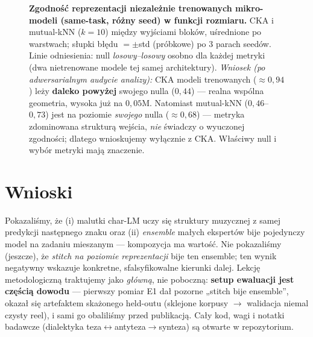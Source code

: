 \documentclass[11pt]{article}
\begin{document}
\begin{figure}[h]
\centering
{}
\caption{\textbf{Zgodność reprezentacji niezależnie trenowanych mikro-modeli (same-task, różny seed) w funkcji rozmiaru.} CKA \cite{cka} i mutual-kNN ($k{=}10$) między wyjściami bloków, uśrednione po warstwach; słupki błędu $=\pm$std (próbkowe) po 3 parach seedów. Linie odniesienia: null \emph{losowy--losowy} osobno dla każdej metryki (dwa nietrenowane modele tej samej architektury). \emph{Wniosek (po adwersarialnym audycie analizy):} CKA modeli trenowanych ($\approx0{,}94$) leży \textbf{daleko powyżej} swojego nulla ($0{,}44$) --- realna wspólna geometria, wysoka już na $0{,}05$M. Natomiast mutual-kNN ($0{,}46$--$0{,}73$) jest na poziomie \emph{swojego} nulla ($\approx0{,}68$) --- metryka zdominowana strukturą wejścia, \emph{nie} świadczy o wyuczonej zgodności; dlatego wnioskujemy wyłącznie z CKA. Właściwy null i wybór metryki mają znaczenie.}
\label{fig:cka}
\end{figure}

\section{Wnioski}
Pokazaliśmy, że (i) malutki char-LM uczy się struktury muzycznej z samej predykcji następnego znaku oraz (ii)
\emph{ensemble} małych ekspertów bije pojedynczy model na zadaniu mieszanym --- kompozycja ma wartość. Nie
pokazaliśmy (jeszcze), że \emph{stitch na poziomie reprezentacji} bije ten ensemble; ten wynik negatywny wskazuje
konkretne, sfalsyfikowalne kierunki dalej. Lekcję metodologiczną traktujemy jako \emph{główną}, nie poboczną:
\textbf{setup ewaluacji jest częścią dowodu} --- pierwszy pomiar E1 dał pozorne „stitch bije ensemble'', okazał się
artefaktem skażonego held-outu (sklejone korpusy $\to$ walidacja niemal czysty reel), i sami go obaliliśmy przed
publikacją. Cały kod, wagi i notatki badawcze (dialektyka teza$\leftrightarrow$antyteza$\to$synteza) są otwarte w repozytorium.
\end{document}
